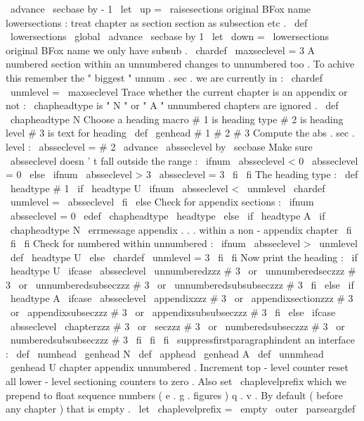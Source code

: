 {{{\
advance
\
secbase
by
-
1
}
\
let
\
up
=
\
raisesections
%
original
BFox
name
%
lowersections
:
treat
chapter
as
section
section
as
subsection
etc
.
\
def
\
lowersections
{
\
global
\
advance
\
secbase
by
1
}
\
let
\
down
=
\
lowersections
%
original
BFox
name
%
we
only
have
subsub
.
\
chardef
\
maxseclevel
=
3
%
%
A
numbered
section
within
an
unnumbered
changes
to
unnumbered
too
.
%
To
achive
this
remember
the
"
biggest
"
unnum
.
sec
.
we
are
currently
in
:
\
chardef
\
unmlevel
=
\
maxseclevel
%
%
Trace
whether
the
current
chapter
is
an
appendix
or
not
:
%
\
chapheadtype
is
"
N
"
or
"
A
"
unnumbered
chapters
are
ignored
.
\
def
\
chapheadtype
{
N
}
%
Choose
a
heading
macro
%
#
1
is
heading
type
%
#
2
is
heading
level
%
#
3
is
text
for
heading
\
def
\
genhead
#
1
#
2
#
3
{
%
%
Compute
the
abs
.
sec
.
level
:
\
absseclevel
=
#
2
\
advance
\
absseclevel
by
\
secbase
%
Make
sure
\
absseclevel
doesn
'
t
fall
outside
the
range
:
\
ifnum
\
absseclevel
<
0
\
absseclevel
=
0
\
else
\
ifnum
\
absseclevel
>
3
\
absseclevel
=
3
\
fi
\
fi
%
The
heading
type
:
\
def
\
headtype
{
#
1
}
%
\
if
\
headtype
U
%
\
ifnum
\
absseclevel
<
\
unmlevel
\
chardef
\
unmlevel
=
\
absseclevel
\
fi
\
else
%
Check
for
appendix
sections
:
\
ifnum
\
absseclevel
=
0
\
edef
\
chapheadtype
{
\
headtype
}
%
\
else
\
if
\
headtype
A
\
if
\
chapheadtype
N
%
\
errmessage
{
appendix
.
.
.
within
a
non
-
appendix
chapter
}
%
\
fi
\
fi
\
fi
%
Check
for
numbered
within
unnumbered
:
\
ifnum
\
absseclevel
>
\
unmlevel
\
def
\
headtype
{
U
}
%
\
else
\
chardef
\
unmlevel
=
3
\
fi
\
fi
%
Now
print
the
heading
:
\
if
\
headtype
U
%
\
ifcase
\
absseclevel
\
unnumberedzzz
{
#
3
}
%
\
or
\
unnumberedseczzz
{
#
3
}
%
\
or
\
unnumberedsubseczzz
{
#
3
}
%
\
or
\
unnumberedsubsubseczzz
{
#
3
}
%
\
fi
\
else
\
if
\
headtype
A
%
\
ifcase
\
absseclevel
\
appendixzzz
{
#
3
}
%
\
or
\
appendixsectionzzz
{
#
3
}
%
\
or
\
appendixsubseczzz
{
#
3
}
%
\
or
\
appendixsubsubseczzz
{
#
3
}
%
\
fi
\
else
\
ifcase
\
absseclevel
\
chapterzzz
{
#
3
}
%
\
or
\
seczzz
{
#
3
}
%
\
or
\
numberedsubseczzz
{
#
3
}
%
\
or
\
numberedsubsubseczzz
{
#
3
}
%
\
fi
\
fi
\
fi
\
suppressfirstparagraphindent
}
%
an
interface
:
\
def
\
numhead
{
\
genhead
N
}
\
def
\
apphead
{
\
genhead
A
}
\
def
\
unnmhead
{
\
genhead
U
}
%
chapter
appendix
unnumbered
.
Increment
top
-
level
counter
reset
%
all
lower
-
level
sectioning
counters
to
zero
.
%
%
Also
set
\
chaplevelprefix
which
we
prepend
to
float
sequence
numbers
%
(
e
.
g
.
figures
)
q
.
v
.
By
default
(
before
any
chapter
)
that
is
empty
.
\
let
\
chaplevelprefix
=
\
empty
%
\
outer
\
parseargdef
}}
